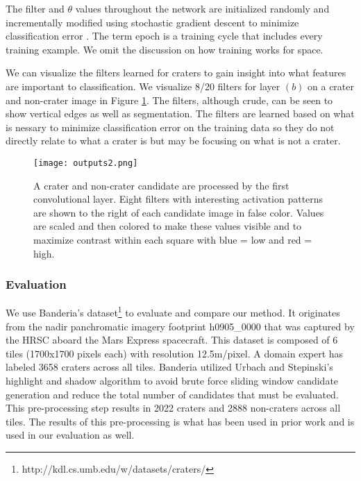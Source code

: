 \documentclass[twoside]{article}
\begin{document}
The filter and $\theta$ values throughout the network are initialized randomly and incrementally modified using stochastic gradient descent to minimize classification error \cite{krizhevsky_imagenet_2012}. The term epoch is a training cycle that includes every training example. We omit the discussion on how training works for space.


We can visualize the filters learned for craters to gain insight into what features are important to classification. We visualize 8/20 filters for layer $(b)$ on a crater and non-crater image in Figure \ref{fig:filters}. The filters, although crude, can be seen to show vertical edges as well as segmentation. The filters are learned based on what is nessary to minimize classification error on the training data so they do not directly relate to what a crater is but may be focusing on what is not a crater.


\begin{figure}[t]
\begin{center}
  \texttt{[image: outputs2.png]}
  \vspace{-10pt}
  \caption[labelInTOC]{A crater and non-crater candidate are processed by the first convolutional layer. Eight filters with interesting activation patterns are shown to the right of each candidate image in false color.  Values are scaled and then colored to make these values visible and to maximize contrast within each square with blue = low and red = high.}
  \label{fig:filters}
  \vspace{-20pt}
\end{center}
\end{figure}


\vspace{-12pt}
\subsubsection*{Evaluation}
\vspace{-8pt}

We use Banderia's \cite{bandeira_automatic_2010} dataset\footnote{http://kdl.cs.umb.edu/w/datasets/craters/} to evaluate and compare our method.  It originates from the nadir panchromatic imagery footprint h0905\_0000 that was captured by the HRSC aboard the Mars Express spacecraft. This dataset is composed of 6 tiles (1700x1700 pixels each) with resolution 12.5m/pixel. A domain expert has labeled 3658 craters across all tiles. Banderia utilized Urbach and Stepinski's \cite{urbach_automatic_2009} highlight and shadow algorithm to avoid brute force sliding window candidate generation and reduce the total number of candidates that must be evaluated. This pre-processing step results in 2022 craters and 2888 non-craters across all tiles. The results of this pre-processing is what has been used in prior work and is used in our evaluation as well.  
\end{document}
